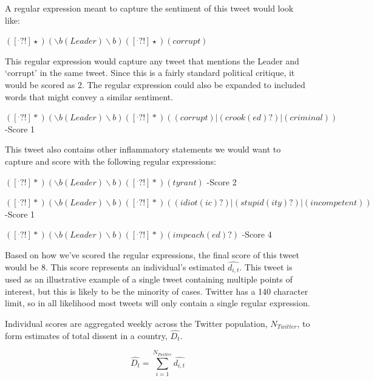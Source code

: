 \documentclass[12pt]{article}
\begin{document}
\begin{spacing}{1.5}
\noindent A regular expression meant to capture the sentiment of this tweet would look like:

\begin{center}
$([^.?!]\star)(\backslash b(Leader)\backslash b)([^.?!]\star)(corrupt)$
\end{center}

\noindent This regular expression would capture any tweet that mentions the Leader and ‘corrupt’ in the same tweet. Since this is a fairly standard political critique, it would be scored as 2. The regular expression could also be expanded to included words that might convey a similar sentiment.

\begin{center}
$([^.?!]*) (\backslash b(Leader)\backslash b)([^.?!]*)((corrupt)|(crook(ed)?)|(criminal))$ -Score 1
\end{center}

\noindent This tweet also contains other inflammatory statements we would want to capture and score with the following regular expressions:  

\vspace{.5 em}


\begin{center}
$([^.?!]*)(\backslash b(Leader)\backslash b)([^.?!]*)(tyrant)$ -Score 2

\vspace{.5 em}
$([^.?!]*) (\backslash b(Leader)\backslash b)([^.?!]*)((idiot(ic)?)|(stupid(ity)?)|(incompetent))$ -Score 1

\vspace{.5 em}

$([^.?!]*)(\backslash b(Leader)\backslash b)([^.?!]*)(impeach(ed)?)$ -Score 4
\end{center}


\noindent Based on how we've scored the regular expressions, the final score of this tweet would be 8. This score represents an individual's estimated $\hat{d_{i,t}}$. This tweet is used as an illustrative example of a single tweet containing multiple points of interest, but this is likely to be the minority of cases. Twitter has a 140 character limit, so in all likelihood most tweets will only contain a single regular expression.  

Individual scores are aggregated weekly across the Twitter population, $N_{Twitter}$, to form estimates of total dissent in a country, $\hat{D_t}$. 

\vspace{.5 em}
\begin{equation}
\hat{D_t}= \sum_{i=1}^{N_{Twitter}} \hat{d_{i,t}} 	
\end{equation}


\end{spacing}
\end{document}
